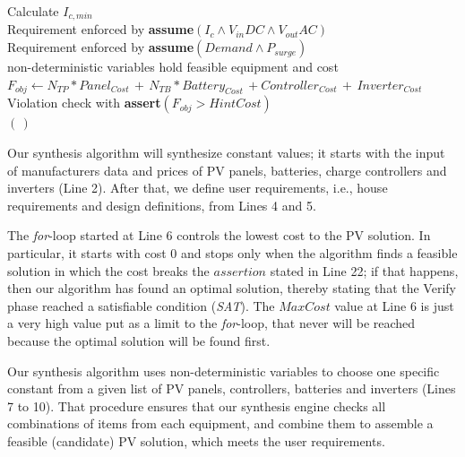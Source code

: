 \documentclass[review]{elsarticle}
\begin{document}
\begin{algorithm}
\begin{algorithmic}[1]
 	\STATE Calculate $I_{c,min}$ \\
 	\STATE Requirement enforced by \textbf{assume}$(I_{c} \wedge V_{in}DC \wedge V_{out}AC)$ \\
	\STATE Requirement enforced by \textbf{assume}$(Demand \wedge P_{surge})$ \\
	\STATE non-deterministic variables hold feasible equipment and cost  \\
	\STATE $F_{obj} \leftarrow  N_{TP}*Panel_{Cost} \, + \, N_{TB}*Battery_{Cost} \, + Controller_{Cost} \, + \, Inverter_{Cost}$ \\
	\STATE Violation check with \textbf{assert}$(F_{obj} > HintCost)$ \\
  \ENDFOR
 \RETURN $(\,)$ 
 \end{algorithmic} 
 \label{alg:verification-algorithm}
 \end{algorithm}
%

Our synthesis algorithm will synthesize constant values; it starts with the input of manufacturers data and prices of PV panels, batteries, charge controllers and inverters (Line 2). After that, we define user requirements, i.e., house requirements and design definitions, from Lines 4 and 5. 

The \textit{for}-loop started at Line 6 controls the lowest cost to the PV solution. In particular, it starts with cost $0$ and stops only when the algorithm finds a feasible solution in which the cost breaks the $assertion$ stated in Line 22; if that happens, then our algorithm has found an optimal solution, thereby stating that the {\sc Verify} phase reached a satisfiable condition (\textit{SAT}). The $MaxCost$ value at Line 6 is just a very high value put as a limit to the \textit{for}-loop, that never will be reached because the optimal solution will be found first.

Our synthesis algorithm uses non-deterministic variables to choose one specific constant from a given list of PV panels, controllers, batteries and inverters (Lines 7 to 10). That procedure ensures that our synthesis engine checks all combinations of items from each equipment, and combine them to assemble a feasible (candidate) PV solution, which meets the user requirements.
\end{document}

